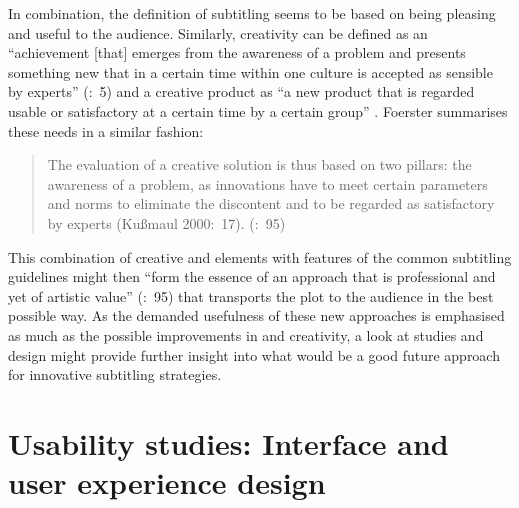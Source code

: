 In combination, the definition of  subtitling seems to be based on being pleasing and useful to the audience. Similarly, creativity can be defined as an “achievement [that] emerges from the awareness of a problem and presents something new that in a certain time within one culture is accepted as sensible by experts” (\citealt{preiser1976}:~5) and a creative product as “a new product that is regarded usable or satisfactory at a certain time by a certain group” \citep{stein1953}. Foerster summarises these needs in a similar fashion: 
\begin{quote}
The evaluation of a creative solution is thus based on two pillars: the awareness of a problem, as innovations have to meet certain parameters and norms to eliminate the discontent and to be regarded as satisfactory by experts (Kußmaul 2000:~17). (\citeyear{Foerster2010}:~95)
\end{quote}
This combination of creative and  elements with features of the common subtitling guidelines might then “form the essence of an approach that is professional and yet of artistic value” (\citeyear{Foerster2010}:~95) that transports the plot to the audience in the best possible way. As the demanded usefulness of these new approaches is emphasised as much as the possible improvements in  and creativity, a look at  studies and  design might provide further insight into what would be a good future approach for innovative subtitling strategies.

\section{Usability studies: Interface and user experience design}\label{sec:3.2}

